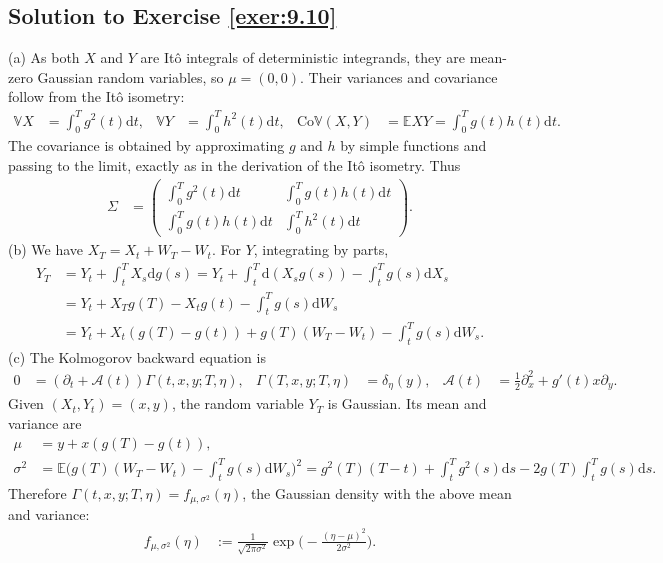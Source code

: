 \documentclass[12pt]{book}
\numberwithin{equation}{chapter}
\theoremstyle{plain}
\numberwithin{theorem}{section}
\theoremstyle{definition}
\numberwithin{exercise}{chapter}
\newcommand{\<}{\langle}
\renewcommand{\>}{\rangle}
\renewcommand{\(}{\left(}
\renewcommand{\)}{\right)}
\renewcommand{\[}{\left[}
\renewcommand{\]}{\right]}
\newcommand\Eb{\mathds{E}}
\newcommand\Vb{\mathds{V}}
\newcommand\Ac{\mathscr{A}}
\newcommand\sig{\sigma}
\newcommand\Sig{\Sigma}
\newcommand\Gam{\Gamma}
\newcommand\del{\delta}
\renewcommand\d{\partial}
\newcommand\dd{\mathrm{d}}
\begin{document}
\subsection*{Solution to Exercise \ref{exer:9.10}}
(a) As both $X$ and $Y$ are It\^o integrals of deterministic integrands, they are mean-zero Gaussian random variables, so $\mu = (0,0)$.  Their variances and covariance follow from the It\^o isometry:
\begin{align}
\Vb X
	&=	\int_0^T g^2(t) \dd t , &
\Vb Y
	&=	\int_0^T h^2(t) \dd t , &
\text{Co}\Vb(X,Y)
	&=	\Eb X Y
	=		\int_0^T g(t) h(t) \dd t .
\end{align}
The covariance is obtained by approximating $g$ and $h$ by simple functions and passing to the limit, exactly as in the derivation of the It\^o isometry.  Thus
\begin{align}
\Sig
	&=	\( \begin{array}{cc}
			\int_0^T g^2(t) \dd t & \int_0^T g(t) h(t) \dd t \\
			\int_0^T g(t) h(t) \dd t & \int_0^T h^2(t) \dd t
			\end{array} \) .
\end{align}
(b) We have $X_T = X_t + W_T - W_t$.  For $Y$, integrating by parts,
\begin{align}
Y_T
	&=	Y_t + \int_t^T X_s \dd g(s)
	=		Y_t + \int_t^T \dd ( X_s g(s) ) - \int_t^T g(s) \dd X_s \\
	&=	Y_t + X_T g(T) - X_t g(t) - \int_t^T g(s) \dd W_s \\
	&=	Y_t + X_t ( g(T) - g(t) ) + g(T) ( W_T - W_t ) - \int_t^T g(s) \dd W_s .
\end{align}
(c) The Kolmogorov backward equation is
\begin{align}
0
	&=	(\d_t + \Ac(t)) \Gam( t,x,y;T,\eta) , &
\Gam(T,x,y;T,\eta)
	&=	\del_{\eta}(y) , &
\Ac(t)
	&=	\tfrac{1}{2} \d_x^2 + g'(t) x \d_y .
\end{align}
Given $(X_t,Y_t) = (x,y)$, the random variable $Y_T$ is Gaussian.  Its mean and variance are
\begin{align}
\mu
	&=	y + x ( g(T) - g(t) ) , \\
\sig^2
	&=	\Eb \Big( g(T) (W_T-W_t) - \int_t^T g(s) \dd W_s \Big)^2
	=		g^2(T)(T-t) + \int_t^T g^2(s) \dd s - 2 g(T) \int_t^T g(s) \dd s .
\end{align}
Therefore $\Gam(t,x,y;T,\eta) = f_{\mu,\sig^2}(\eta)$, the Gaussian density with the above mean and variance:
\begin{align}
f_{\mu,\sig^2}(\eta)
	&:=	\frac{1}{ \sqrt{2\pi\sig^2 }} \exp \Big( -\frac{(\eta - \mu)^2}{2 \sig^2} \Big) .
\end{align}
\end{document}
